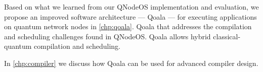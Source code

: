 Based on what we learned from our QNodeOS implementation and evaluation, we propose an improved software architecture --- Qoala --- for executing applications on quantum network nodes in \cref{chp:qoala}.
Qoala that addresses the compilation and scheduling challenges found in QNodeOS.
Qoala allows hybrid classical-quantum compilation and scheduling.

In \cref{chp:compiler} we discuss how Qoala can be used for advanced compiler design.







\begin{xstretch}
\printbibliography[heading=subbibintoc,title={References},notcategory=noprint]
\end{xstretch}
